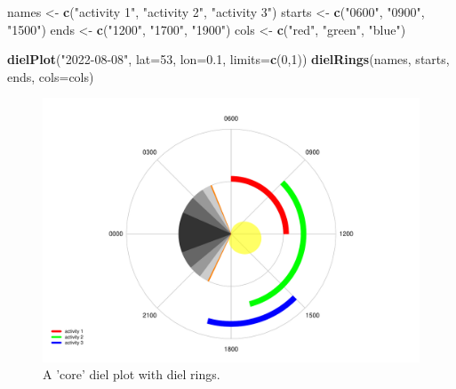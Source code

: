 \documentclass[
]{book}
\newenvironment{Shaded}{\begin{snugshade}}{\end{snugshade}}
\newcommand{\AttributeTok}[1]{\textcolor[rgb]{0.13,0.29,0.53}{#1}}
\newcommand{\DecValTok}[1]{\textcolor[rgb]{0.00,0.00,0.81}{#1}}
\newcommand{\FloatTok}[1]{\textcolor[rgb]{0.00,0.00,0.81}{#1}}
\newcommand{\FunctionTok}[1]{\textcolor[rgb]{0.13,0.29,0.53}{\textbf{#1}}}
\newcommand{\NormalTok}[1]{#1}
\newcommand{\OtherTok}[1]{\textcolor[rgb]{0.56,0.35,0.01}{#1}}
\newcommand{\StringTok}[1]{\textcolor[rgb]{0.31,0.60,0.02}{#1}}
\begin{document}
\begin{Shaded}
\begin{Highlighting}[]
\NormalTok{names }\OtherTok{\textless{}{-}} \FunctionTok{c}\NormalTok{(}\StringTok{"activity 1"}\NormalTok{, }\StringTok{"activity 2"}\NormalTok{, }\StringTok{"activity 3"}\NormalTok{)}
\NormalTok{starts }\OtherTok{\textless{}{-}} \FunctionTok{c}\NormalTok{(}\StringTok{"0600"}\NormalTok{, }\StringTok{"0900"}\NormalTok{, }\StringTok{"1500"}\NormalTok{)}
\NormalTok{ends }\OtherTok{\textless{}{-}} \FunctionTok{c}\NormalTok{(}\StringTok{"1200"}\NormalTok{, }\StringTok{"1700"}\NormalTok{, }\StringTok{"1900"}\NormalTok{)}
\NormalTok{cols }\OtherTok{\textless{}{-}} \FunctionTok{c}\NormalTok{(}\StringTok{"red"}\NormalTok{, }\StringTok{"green"}\NormalTok{, }\StringTok{"blue"}\NormalTok{)}

\FunctionTok{dielPlot}\NormalTok{(}\StringTok{"2022{-}08{-}08"}\NormalTok{, }\AttributeTok{lat=}\DecValTok{53}\NormalTok{, }\AttributeTok{lon=}\FloatTok{0.1}\NormalTok{, }\AttributeTok{limits=}\FunctionTok{c}\NormalTok{(}\DecValTok{0}\NormalTok{,}\DecValTok{1}\NormalTok{))}
\FunctionTok{dielRings}\NormalTok{(names, starts, ends, }\AttributeTok{cols=}\NormalTok{cols)}
\end{Highlighting}
\end{Shaded}

\begin{figure}

{\centering \includegraphics[width=0.9\linewidth]{_main_files/figure-latex/diel-plot-rings-1-1} 

}

\caption{A 'core' diel plot with diel rings.}\label{fig:diel-plot-rings-1}
\end{figure}
\end{document}

